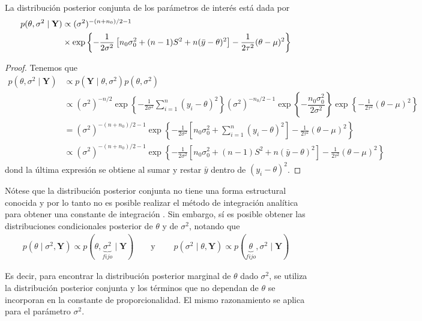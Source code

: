 \documentclass[10pt,openright]{book}\usepackage[]{graphicx}\usepackage[]{color}
\begin{document}
\begin{Res}
La distribuci\'on posterior conjunta de los par\'ametros de inter\'es est\'a dada por
\begin{align}
p(\theta,\sigma^2 \mid \mathbf{Y})&\propto (\sigma^2)^{-(n+n_0)/2-1} \notag \\
&\times
\exp\left\{-\frac{1}{2\sigma^2}\left[n_0\sigma^2_0+(n-1)S^2
                                     +n(\bar{y}-\theta)^2\right]-\frac{1}{2\tau^2}(\theta-\mu)^2\right\}
\end{align}
\end{Res}


\begin{proof}
Tenemos que
\begin{align*}
p(\theta,\sigma^2 \mid \mathbf{Y})&\propto p(\mathbf{Y} \mid \theta,\sigma^2)p(\theta,\sigma^2)\\
&\propto(\sigma^2)^{-n/2}\exp\left\{-\frac{1}{2\sigma^2}\sum_{i=1}^n(y_i-\theta)^2\right\}(\sigma^2)^{-n_0/2-1}\exp\left\{-\dfrac{n_0\sigma^2_0}{2\sigma^2}\right\}
\exp\left\{-\frac{1}{2\tau^2}(\theta-\mu)^2\right\} \\
&=(\sigma^2)^{-(n+n_0)/2-1}\exp\left\{-\frac{1}{2\sigma^2}\left[n_0\sigma^2_0+\sum_{i=1}^n(y_i-\theta)^2\right]-\frac{1}{2\tau^2}(\theta-\mu)^2\right\}\\
&\propto (\sigma^2)^{-(n+n_0)/2-1}\exp\left\{-\frac{1}{2\sigma^2}\left[n_0\sigma^2_0+(n-1)S^2
                                     +n(\bar{y}-\theta)^2\right]-\frac{1}{2\tau^2}(\theta-\mu)^2\right\}
\end{align*}
dond la \'ultima expresi\'on se obtiene al sumar y restar $\bar{y}$ dentro de $(y_i-\theta)^2$.
\end{proof}


N\'otese que la distribuci\'on posterior conjunta no tiene una forma estructural conocida y por lo tanto no es posible realizar el m\'etodo de integraci\'on anal\'itica para obtener una constante de integraci\'on \cite{Migon}. Sin embargo, s\'i es posible obtener las distribuciones condicionales posterior de $\theta$ y de $\sigma^2$, notando que
\begin{align*}
p(\theta \mid \sigma^2,\mathbf{Y})\propto p(\theta,\underbrace{\sigma^2}_{fijo} \mid \mathbf{Y})
\ \ \ \ \ \ \ \ \ \text{y} \ \ \ \ \ \ \ \ \ \
p(\sigma^2 \mid \theta,\mathbf{Y})\propto p(\underbrace{\theta}_{fijo},\sigma^2 \mid \mathbf{Y})
\end{align*}

Es decir, para encontrar la distribuci\'on posterior marginal de $\theta$ dado $\sigma^2$, se utiliza la distribuci\'on posterior conjunta y los t\'erminos que no dependan de $\theta$ se incorporan en la constante de proporcionalidad. El mismo razonamiento se aplica para el par\'ametro $\sigma^2$.
\end{document}
